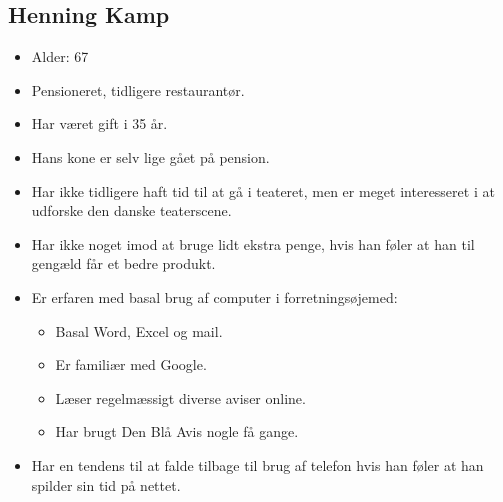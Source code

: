 \subsection{Henning Kamp}
\begin{itemize}
    \item Alder: 67
    \item Pensioneret, tidligere restaurantør.
    \item Har været gift i 35 år.
    \item Hans kone er selv lige gået på pension.
    \item Har ikke tidligere haft tid til at gå i teateret, men er meget interesseret i at udforske den danske teaterscene.
    \item Har ikke noget imod at bruge lidt ekstra penge, hvis han føler at han til gengæld får et bedre produkt.
    \item Er erfaren med basal brug af computer i forretningsøjemed:
        \begin{itemize}
            \item Basal Word, Excel og mail.
            \item Er familiær med Google.
            \item Læser regelmæssigt diverse aviser online.
            \item Har brugt Den Blå Avis nogle få gange.
        \end{itemize}
    \item Har en tendens til at falde tilbage til brug af telefon hvis han føler at han spilder sin tid på nettet.
\end{itemize}

